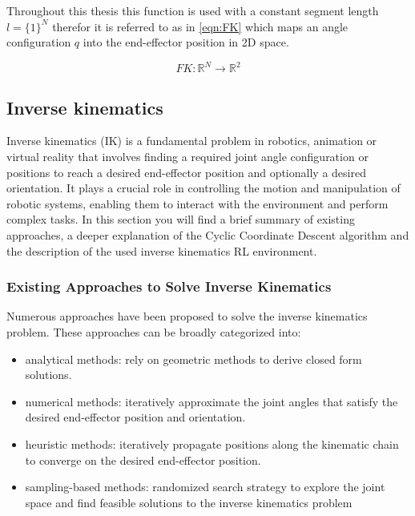 Throughout this thesis this function is used with a constant segment length $l = \{1\}^N$ therefor it is referred to as in \eqref{eqn:FK} which maps an angle configuration $q$ into the end-effector position in 2D space.

\begin{equation}\label{eqn:FK}
	FK: \mathbb{R}^N \to \mathbb{R}^2
\end{equation}

\subsection{Inverse kinematics}

Inverse kinematics (IK) is a fundamental problem in robotics, animation or virtual reality that involves finding a required joint angle configuration or positions to reach a desired end-effector position and optionally a desired orientation. It plays a crucial role in controlling the motion and manipulation of robotic systems, enabling them to interact with the environment and perform complex tasks. 
In this section you will find a brief summary of existing approaches, a deeper explanation of the Cyclic Coordinate Descent algorithm and the description of the used inverse kinematics RL environment.

\subsubsection{Existing Approaches to Solve Inverse Kinematics}

Numerous approaches have been proposed to solve the inverse kinematics problem. These approaches can be broadly categorized into: 
\begin{itemize}
	\item analytical methods: rely on geometric methods to derive closed form solutions.
	\item numerical methods: iteratively approximate the joint angles that satisfy the desired end-effector position and orientation.
	\item heuristic methods: iteratively propagate positions along the kinematic chain to converge on the desired end-effector position.
	\item sampling-based methods: randomized search strategy to explore the joint space and find feasible solutions to the inverse kinematics problem
\end{itemize}


